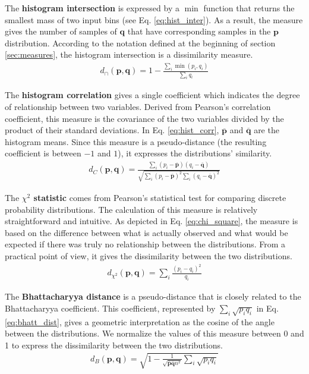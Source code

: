 The \textbf{histogram intersection} \citep{Swain.Ballard:IJCV:1991} is expressed by a $\min$ function that returns the smallest mass of two input bins (see Eq. \eqref{eq:hist_inter}). As a result, the measure gives the number of samples of $\mathbf{q}$ that have corresponding samples in the $\mathbf{p}$ distribution. According to the notation defined at the beginning of section \ref{sec:measures}, the histogram intersection is a dissimilarity measure.
\begin{eqnarray}
d_{\cap}(\mathbf{p}, \mathbf{q}) = 1 - \frac{\sum_{i}\min(p_i, q_i)}{\sum_{i}q_i} \label{eq:hist_inter}
\end{eqnarray}

The \textbf{histogram correlation} gives a single coefficient which indicates the degree of relationship between two variables. Derived from Pearson's correlation coefficient, this measure is the covariance of the two variables divided by the product of their standard deviations. In Eq. \eqref{eq:hist_corr}, $\overline{\mathbf{p}}$ and $\overline{\mathbf{q}}$ are the histogram means. Since this measure is a pseudo-distance (the resulting coefficient is between $-1$ and $1$), it expresses the distributions' similarity.  
\begin{eqnarray}
d_{C}(\mathbf{p}, \mathbf{q}) = \frac{\sum_{i}(p_i - \overline{\mathbf{p}})(q_i - \overline{\mathbf{q}})}{\sqrt{\sum_{i}(p_i - \overline{\mathbf{p}})^{2}\sum_{i}(q_i - \overline{\mathbf{q}})^{2}}} \label{eq:hist_corr}
\end{eqnarray}

The \textbf{$\chi^2$ statistic} comes from Pearson's statistical test for comparing discrete probability distributions. The calculation of this measure is relatively straightforward and intuitive. As depicted in Eq. \eqref{eq:chi_square}, the measure is based on the difference between what is actually observed and what would be expected if there was truly no relationship between the distributions. From a practical point of view, it gives the dissimilarity between the two distributions.
\begin{eqnarray}
d_{\chi^2}(\mathbf{p},\mathbf{q}) = \sum\nolimits_i \frac{(p_i - q_i)^2}{q_i} \label{eq:chi_square}
\end{eqnarray}


The \textbf{Bhattacharyya distance} \citep{Bhattacharyya:IJS:1946} is a pseudo-distance that is closely related to the Bhattacharyya coefficient. This coefficient, represented by $\sum_i\sqrt{p_{i}q_{i}}$ in Eq. \eqref{eq:bhatt_dist}, gives a geometric interpretation as the cosine of the angle between the distributions. We normalize the values of this measure between 0 and 1 to express the dissimilarity between the two distributions.
\begin{eqnarray}
d_{B}(\mathbf{p}, \mathbf{q}) = \sqrt{1- \frac{1}{\sqrt{\overline{\mathbf{p}} \overline{\mathbf{q}} n^2}} \sum\nolimits_{i} \sqrt{p_i q_i}} \label{eq:bhatt_dist}
\end{eqnarray}

